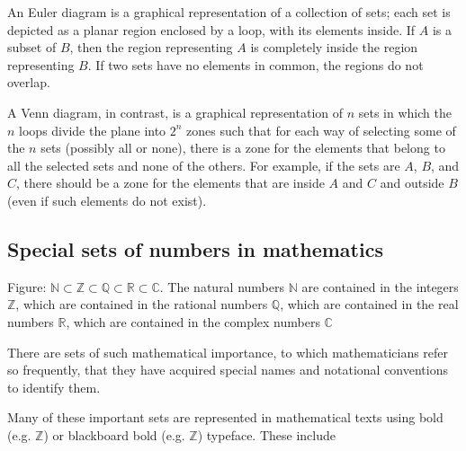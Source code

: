 An Euler diagram is a graphical representation of a collection of sets; each set is
depicted as a planar region enclosed by a loop, with its elements inside. If $A$ is a
subset of $B$, then the region representing $A$ is completely inside the region
representing $B$. If two sets have no elements in common, the regions do not overlap.



A Venn diagram, in contrast, is a graphical representation of $n$ sets in which the $n$
loops divide the plane into $2^n$ zones such that for each way of selecting some of the
$n$ sets (possibly all or none), there is a zone for the elements that belong to all the
selected sets and none of the others. For example, if the sets are $A$, $B$, and $C$,
there should be a zone for the elements that are inside $A$ and $C$ and outside $B$ (even
if such elements do not exist).




\subsection{Special sets of numbers in mathematics}
\label{sss:spec-c304}







Figure: $\mathbb{N} \subset \mathbb{Z} \subset \mathbb{Q} \subset \mathbb{R} \subset
\mathbb{C}$. The natural numbers $\mathbb{N}$ are contained in the integers $\mathbb{Z}$,
which are contained in the rational numbers $\mathbb{Q}$, which are contained in the real
numbers $\mathbb{R}$, which are contained in the complex numbers $\mathbb{C}$



There are sets of such mathematical importance, to which mathematicians refer so
frequently, that they have acquired special names and notational conventions to identify
them.



Many of these important sets are represented in mathematical texts using bold (e.g.
$\mathbb{Z}$) or blackboard bold (e.g. $\mathbb Z$) typeface. These include




